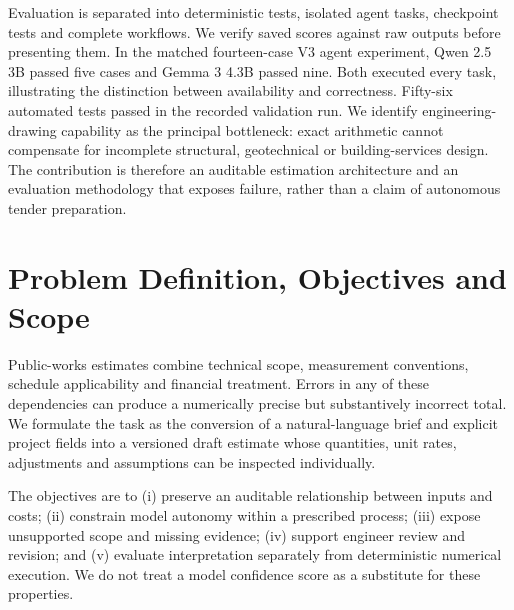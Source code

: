 \documentclass[11pt,a4paper]{article}
\begin{document}
Evaluation is separated into deterministic tests, isolated agent tasks, checkpoint tests and complete workflows. We verify saved scores against raw outputs before presenting them. In the matched fourteen-case V3 agent experiment, Qwen 2.5 3B passed five cases and Gemma 3 4.3B passed nine. Both executed every task, illustrating the distinction between availability and correctness. Fifty-six automated tests passed in the recorded validation run. We identify engineering-drawing capability as the principal bottleneck: exact arithmetic cannot compensate for incomplete structural, geotechnical or building-services design. The contribution is therefore an auditable estimation architecture and an evaluation methodology that exposes failure, rather than a claim of autonomous tender preparation.

\clearpage
\tableofcontents\clearpage\listoffigures\listoftables\clearpage
{}
\section{Problem Definition, Objectives and Scope}
Public-works estimates combine technical scope, measurement conventions, schedule applicability and financial treatment. Errors in any of these dependencies can produce a numerically precise but substantively incorrect total. We formulate the task as the conversion of a natural-language brief and explicit project fields into a versioned draft estimate whose quantities, unit rates, adjustments and assumptions can be inspected individually.

The objectives are to (i) preserve an auditable relationship between inputs and costs; (ii) constrain model autonomy within a prescribed process; (iii) expose unsupported scope and missing evidence; (iv) support engineer review and revision; and (v) evaluate interpretation separately from deterministic numerical execution. We do not treat a model confidence score as a substitute for these properties.
\end{document}

